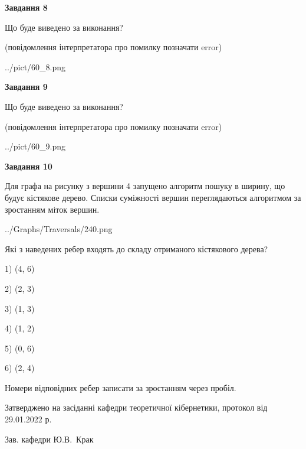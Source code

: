 \documentclass[12pt, ukrainian]{article}
\begin{document}
{\begin {large}
{\begin {center}\textbf{Завдання 8}\end {center}}\par
Що буде виведено за виконання?\par
 (повідомлення інтерпретатора про помилку позначати error)\par
\begin{center}
	{../pict/60_8.png}
\end{center}
\newpage

{\begin {center}\textbf{Завдання 9}\end {center}}\par
Що буде виведено за виконання?\par
 (повідомлення інтерпретатора про помилку позначати error)\par
\begin{center}
	{../pict/60_9.png}
\end{center}
\newpage

{\begin {center}\textbf{Завдання 10}\end {center}}\par
Для графа на рисунку з вершини 4 запущено алгоритм пошуку в ширину, що будує кістякове дерево. Списки суміжності вершин переглядаються алгоритмом за зростанням міток вершин.\par
\begin{center}
	{../Graphs/Traversals/240.png}
\end{center}
\par Які з наведених ребер входять до складу отриманого кістякового дерева?\par
1) (4, 6)\par
2) (2, 3)\par
3) (1, 3)\par
4) (1, 2)\par
5) (0, 6)\par
6) (2, 4)\par
{\vskip 15pt} Номери відповідних ребер записати за зростанням через пробіл.\par
\newpage


\end {large}
}
{\smallskip \begin {small} Затверджено на засіданні кафедри теоретичної кібернетики, протокол  від   29.01.2022 р.\par\smallskip\smallskip
{\parbox {6.5 cm}{Зав. кафедри \dotfill Ю.В.~Крак}} \end{small}}
\end{document}

